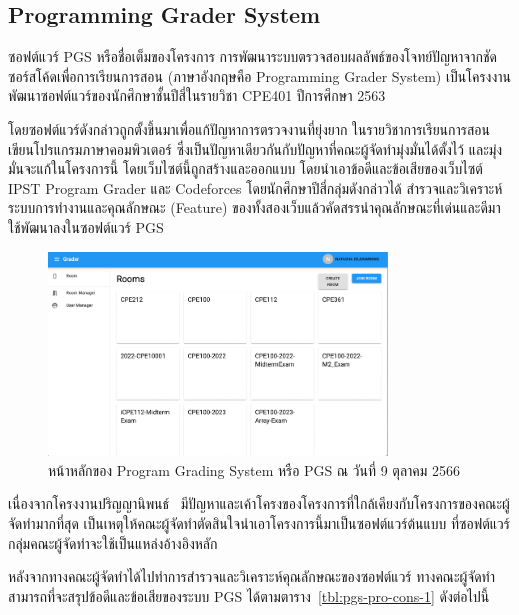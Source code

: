 \documentclass[12pt,one side,openright,a4paper]{cpe-thesis-th}
\newcommand{\thaijustify}[1]{%
  \par\hspace{30pt}\justifying
  #1
}
\begin{document}
\subsection{Programming Grader System}
\thaijustify{
  ซอฟต์แวร์ PGS หรือชื่อเต็มของโครงการ การพัฒนาระบบตรวจสอบผลลัพธ์ของโจทย์ปัญหาจากชัดซอร์สโค้ดเพื่อการเรียนการสอน (ภาษาอังกฤษคือ Programming Grader System) เป็นโครงงานพัฒนาซอฟต์แวร์ของนักศึกษาชั้นปีสี่ในรายวิชา CPE401 ปีการศึกษา 2563~\cite{nattawat20pgs}
}
\thaijustify{
  โดยซอฟต์แวร์ดังกล่าวถูกตั้งขึ้นมาเพื่อแก้ปัญหาการตรวจงานที่ยุ่งยาก ในรายวิชาการเรียนการสอนเขียนโปรแกรมภาษาคอมพิวเตอร์ ซึ่งเป็นปัญหาเดียวกันกับปัญหาที่คณะผู้จัดทำมุ่งมั่นได้ตั้งไว้ และมุ่งมั่นจะแก้ในโครงการนี้ โดยเว็บไซต์นี้ถูกสร้างและออกแบบ โดยนำเอาข้อดีและข้อเสียของเว็บไซต์ IPST Program Grader และ Codeforces โดยนักศึกษาปีสี่กลุ่มดังกล่าวได้ สำรวจและวิเคราะห์ระบบการทำงานและคุณลักษณะ (Feature) ของทั้งสองเว็บแล้วคัดสรรนำคุณลักษณะที่เด่นและดีมาใช้พัฒนาลงในซอฟต์แวร์ PGS
}
\begin{figure}[H]
  \centering
  \includegraphics[width=9cm]{figure/literature/pgs.png}
  \caption[หน้าหลักของ Program Grading System]{หน้าหลักของ Program Grading System หรือ PGS ณ วันที่ 9 ตุลาคม 2566}\label{fig:pgs-page}
\end{figure}

\thaijustify{
  เนื่องจากโครงงานปริญญานิพนธ์~\cite{nattawat20pgs} มีปัญหาและเค้าโครงของโครงการที่ใกล้เคียงกับโครงการของคณะผู้จัดทำมากที่สุด เป็นเหตุให้คณะผู้จัดทำตัดสินใจนำเอาโครงการนี้มาเป็นซอฟต์แวร์ต้นแบบ ที่ซอฟต์แวร์กลุ่มคณะผู้จัดทำจะใช้เป็นแหล่งอ้างอิงหลัก
}
\thaijustify{
  หลังจากทางคณะผู้จัดทำได้ไปทำการสำรวจและวิเคราะห์คุณลักษณะของซอฟต์แวร์ ทางคณะผู้จัดทำสามารถที่จะสรุปข้อดีและข้อเสียของระบบ PGS ได้ตามตาราง~\ref{tbl:pgs-pro-cons-1} ดังต่อไปนี้
}
\end{document}
